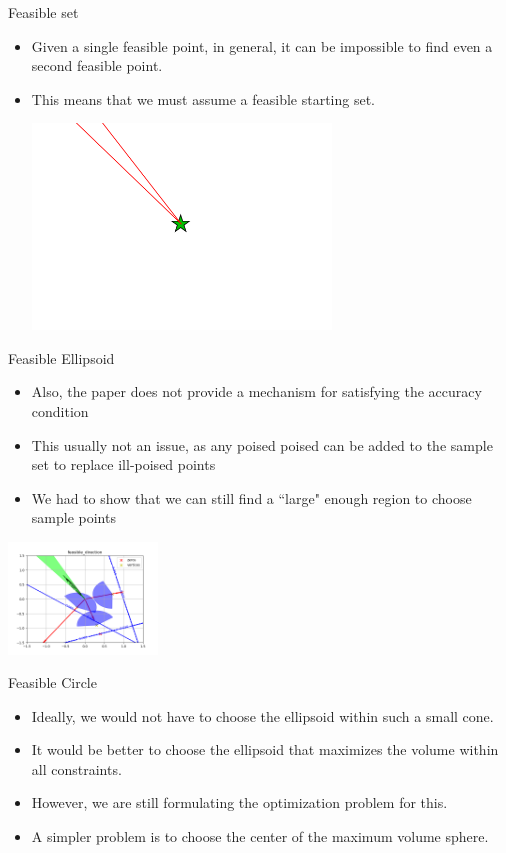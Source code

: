 \documentclass{beamer}
\begin{document}
\begin{frame}{Feasible set}
\begin{itemize}
	\item Given a single feasible point, in general, it can be impossible to find even a second feasible point.
	\item This means that we must assume a feasible starting set.
	\begin{center}
		\includegraphics[width=300px]{images/only_one_feasible_point.png}
	\end{center}
\end{itemize}
\end{frame}




\begin{frame}{Feasible Ellipsoid}
	\begin{itemize}
		\item Also, the paper does not provide a mechanism for satisfying the accuracy condition
		\item This usually not an issue, as any poised poised can be added to the sample set to replace ill-poised points
		\item We had to show that we can still find a ``large" enough region to choose sample points
	\end{itemize}
	\begin{center}
		\includegraphics[width=150px]{images/feasible_direction.png}
	\end{center}
\end{frame}


\begin{frame}{Feasible Circle}

\begin{itemize}
	\item Ideally, we would not have to choose the ellipsoid within such a small cone.
	\item It would be better to choose the ellipsoid that maximizes the volume within all constraints.
	\item However, we are still formulating the optimization problem for this.
	\item A simpler problem is to choose the center of the maximum volume sphere.
\end{itemize}
\end{frame}
\end{document}
